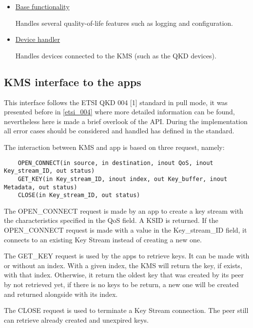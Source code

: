 \begin{refsection}
\begin{itemize}
	\item{\underline{Base functionality}} 
	
	Handles several quality-of-life features such as logging and configuration.
	
	\item{\underline{Device handler}} 
	
	Handles devices connected to the \ac{KMS} (such as the QKD devices).

\end{itemize}



\subsection{KMS interface to the apps}
\label{kms_api_apps}
This interface follows the ETSI QKD 004 [1] standard in pull mode, it was presented before in \ref{etsi_004} where more detailed information can be found, nevertheless here is made a brief overlook of the API. During the implementation all error cases should be considered and handled has defined in the standard.

\vspace{5mm}

The interaction between \ac{KMS} and app is based on three request, namely:

\begin{lstlisting}
	OPEN_CONNECT(in source, in destination, inout QoS, inout Key_stream_ID, out status)
	GET_KEY(in Key_stream_ID, inout index, out Key_buffer, inout Metadata, out status)
	CLOSE(in Key_stream_ID, out status)
\end{lstlisting}

The OPEN\_CONNECT request is made by an app to create a key stream with the characteristics specified in the QoS field. A \ac{KSID} is returned. If the OPEN\_CONNECT request is made with a value in the Key\_stream\_ID field, it connects to an existing Key Stream instead of creating a new one. 

The GET\_KEY request is used by the apps to retrieve keys. It can be made with or without an index. With a given index, the \ac{KMS} will return the key, if exists, with that index. Otherwise, it return the oldest key that was created by its peer by not retrieved yet, if there is no keys to be return, a new one will be created and returned alongside with its index.

The CLOSE request is used to terminate a Key Stream connection. The peer still can retrieve already created and unexpired keys.


\end{refsection}
